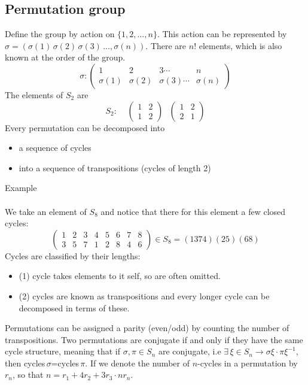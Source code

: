 \documentclass[a4paper,12pt]{article}
\begin{document}
\subsection{Permutation group}
Define the group by action on $\{1,2,\dots,n\}$. This action can be represented by $\sigma=(\sigma(1)\,\sigma(2)\,\sigma(3)\,\dots,\sigma(n))$. There are $n!$ elements, which is also known at the order of the group. 
\begin{equation}
\sigma: 
\begin{pmatrix}
1 & 2 & 3 \cdots & n\\
\sigma(1) & \sigma(2) & \sigma(3) \cdots & \sigma(n)
\end{pmatrix}
\end{equation}
The elements of $S_2$ are
\begin{equation}
S_2:~~~~~\begin{pmatrix}
1 & 2\\
1 & 2
\end{pmatrix}
~~~\begin{pmatrix}
	1 & 2\\
	 2& 1
\end{pmatrix}
\end{equation}
Every permutation can be decomposed into 
\begin{itemize}
\item a sequence of cycles
\item into a sequence of transpositions (cycles of length 2)
\end{itemize}
Example\\\\
We take an element of $S_8$ and notice that there for this element a few closed cycles:
\begin{equation}
\begin{pmatrix}
	1 & 2 & 3 & 4 & 5 & 6 & 7 & 8\\
	3 & 5 & 7 & 1 & 2 & 8 & 4 & 6
\end{pmatrix}\in S_8 =(1374)(25)(68)
\end{equation}
Cycles are classified by their lengths:
\begin{itemize}
\item (1) cycle takes elements to it self, so are often omitted.
\item (2) cycles are known as transpositions and every longer cycle can be decomposed in terms of these. 
\end{itemize}
Permutations can be assigned a parity (even/odd) by counting the number of transpositions. Two permutations are conjugate if and only if they have the same cycle structure, meaning that if $\sigma,\pi\in S_n$ are conjugate, i.e $\exists\,\xi \in S_n\to  \sigma \xi \cdot \pi \xi^{-1}$, then cycles$\,\sigma$=cycles$\,\pi$. If we denote the number of $n$-cycles in a permutation by $r_n$, so that $n=r_1+4r_2+3r_3\cdot nr_n$. 
\end{document}
